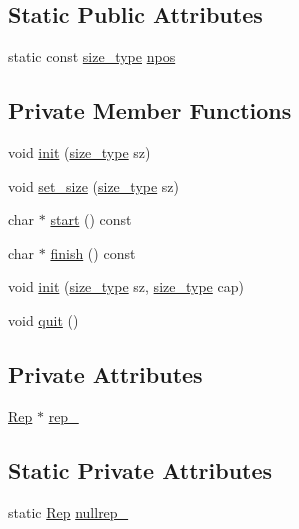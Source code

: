 \subsection*{Static Public Attributes}
\begin{DoxyCompactItemize}
\item 
static const \hyperlink{class_ti_xml_string_abeb2c1893a04c17904f7c06546d0b971}{size\+\_\+type} \hyperlink{class_ti_xml_string_a1aa6260982d3a63f0c822fe40fd7b37f}{npos}
\end{DoxyCompactItemize}
\subsection*{Private Member Functions}
\begin{DoxyCompactItemize}
\item 
void \hyperlink{class_ti_xml_string_a694eacb51c43d8eba8aa7d4552b598ff}{init} (\hyperlink{class_ti_xml_string_abeb2c1893a04c17904f7c06546d0b971}{size\+\_\+type} sz)
\item 
void \hyperlink{class_ti_xml_string_a5d70615367bf2920c25feddf6ac4ad30}{set\+\_\+size} (\hyperlink{class_ti_xml_string_abeb2c1893a04c17904f7c06546d0b971}{size\+\_\+type} sz)
\item 
char $\ast$ \hyperlink{class_ti_xml_string_ad078fd9ba77fee5d9bfb6706466efbf3}{start} () const
\item 
char $\ast$ \hyperlink{class_ti_xml_string_a363decd99ced2e5c2907ffceac3faa31}{finish} () const
\item 
void \hyperlink{class_ti_xml_string_ae11cd23e090fd2e7bb62eda05b45a2d6}{init} (\hyperlink{class_ti_xml_string_abeb2c1893a04c17904f7c06546d0b971}{size\+\_\+type} sz, \hyperlink{class_ti_xml_string_abeb2c1893a04c17904f7c06546d0b971}{size\+\_\+type} cap)
\item 
void \hyperlink{class_ti_xml_string_aa6008ae51286a342cd366fbf1e3eeafc}{quit} ()
\end{DoxyCompactItemize}
\subsection*{Private Attributes}
\begin{DoxyCompactItemize}
\item 
\hyperlink{struct_ti_xml_string_1_1_rep}{Rep} $\ast$ \hyperlink{class_ti_xml_string_ac7be48f31ca451bcb16de428b5c40e0c}{rep\+\_\+}
\end{DoxyCompactItemize}
\subsection*{Static Private Attributes}
\begin{DoxyCompactItemize}
\item 
static \hyperlink{struct_ti_xml_string_1_1_rep}{Rep} \hyperlink{class_ti_xml_string_a345791f81a4b1da64404886f3b2c244d}{nullrep\+\_\+}
\end{DoxyCompactItemize}


